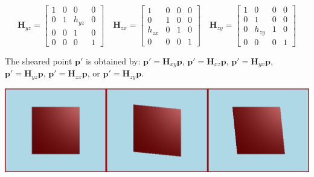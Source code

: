 \documentclass{article}
\begin{document}
	
	\[
	\bm{H}_{yz} = \begin{bmatrix}
		1 & 0 & 0 & 0 \\
		0 & 1 & h_{yz} & 0 \\
		0 & 0 & 1 & 0 \\
		0 & 0 & 0 & 1
	\end{bmatrix}
	\quad
	\bm{H}_{zx} = \begin{bmatrix}
		1 & 0 & 0 & 0 \\
		0 & 1 & 0 & 0 \\
		h_{zx} & 0 & 1 & 0 \\
		0 & 0 & 0 & 1
	\end{bmatrix}
	\quad
	\bm{H}_{zy} = \begin{bmatrix}
		1 & 0 & 0 & 0 \\
		0 & 1 & 0 & 0 \\
		0 & h_{zy} & 1 & 0 \\
		0 & 0 & 0 & 1
	\end{bmatrix}
	\]
	
	
	The sheared point \(\bm{p}'\) is obtained by: \(\bm{p}' = \bm{H}_{xy} \bm{p}\), \(\bm{p}' = \bm{H}_{xz} \bm{p}\), \(\bm{p}' = \bm{H}_{yx} \bm{p}\), \(\bm{p}' = \bm{H}_{yz} \bm{p}\), \(\bm{p}' = \bm{H}_{zx} \bm{p}\), or \(\bm{p}' = \bm{H}_{zy} \bm{p}\).
	
		\begin{center} \includegraphics[width=1\textwidth]{homogenious_notation_images/shear.jpg}  \end{center}
		
\end{document}

